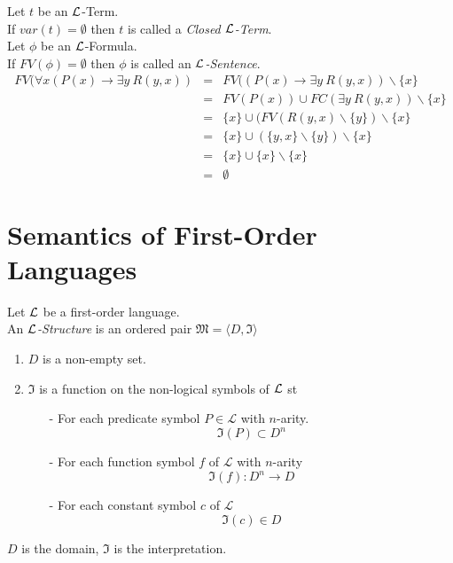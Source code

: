 \documentclass[11pt,a4paper]{article}
\begin{document}
Let $t$ be an $\mathcal{L}$-Term.\\
If $var(t)=\emptyset$ then $t$ is called a \textit{Closed $\mathcal{L}$-Term}.\\

Let $\phi$ be an $\mathcal{L}$-Formula.\\
If $FV(\phi)=\emptyset$ then $\phi$ is called an \textit{$\mathcal{L}$-Sentence}.\\

\[\begin{array}{rcl}
FV(\forall x(P(x)\to\exists y\ R(y,x))&=&FV((P(x)\to\exists y\ R(y,x))\backslash\{x\}\\
&=&FV(P(x))\cup FC(\exists y\ R(y,x))\backslash\{x\}\\
&=&\{x\}\cup(FV(R(y,x)\backslash\{y\})\backslash\{x\}\\
&=&\{x\}\cup(\{y,x\}\backslash\{y\})\backslash\{x\}\\
&=&\{x\}\cup\{x\}\backslash\{x\}\\
&=&\emptyset
\end{array}\]


\section{Semantics of First-Order Languages}

Let $\mathcal{L}$ be a first-order language.\\
An \textit{$\mathcal{L}$-Structure} is an ordered pair $\mathfrak{M}=\langle D,\mathfrak{I}\rangle$
\begin{enumerate}
	\item $D$ is a non-empty set.
	\item $\mathfrak{I}$ is a function on the non-logical symbols of $\mathcal{L}$ st
	\begin{itemize}
		\item[-] For each predicate symbol $P\in\mathcal{L}$ with $n$-arity.
		$$\mathfrak{I}(P)\subset D^n$$
		\item[-] For each function symbol $f$ of $\mathcal{L}$ with $n$-arity
		$$\mathfrak{I}(f):D^n\to D$$
		\item[-] For each constant symbol $c$ of $\mathcal{L}$
		$$\mathfrak{I}(c)\in D$$
	\end{itemize}
\end{enumerate}
\nb $D$ is the domain, $\mathfrak{I}$ is the interpretation.\\
\end{document}
